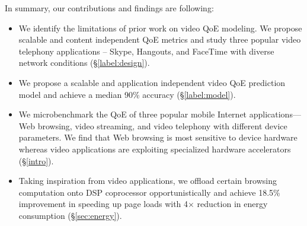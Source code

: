 In summary, our contributions and findings are following:

\begin{itemize}
\item We identify the limitations of prior work on video QoE modeling. We propose scalable and content independent QoE metrics and study three popular video telephony applications -- Skype, Hangouts, and FaceTime with diverse network conditions (\S \ref{label:design}). \\
\item We propose a scalable and application independent video QoE prediction model and achieve a median 90\% accuracy (\S \ref{label:model}).
\item We microbenchmark the QoE of three popular mobile Internet applications--- Web browsing, video streaming, and video telephony with different device parameters. We find that Web browsing is most sensitive to device hardware whereas video applications are exploiting specialized hardware accelerators (\S\ref{intro}). 
\item Taking inspiration from video applications, we offload certain browsing computation onto DSP coprocessor opportunistically and achieve 18.5\% improvement in speeding up page loads with 4$\times$ reduction in energy consumption (\S \ref{sec:energy}).
\end{itemize}

